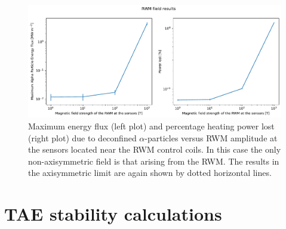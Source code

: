 \documentclass[10pt, a4paper, twoside]{article}
\begin{document}
\begin{figure}[!htb]
    \centering
    \includegraphics[width=0.99\linewidth]{Figures/max_and_total_flux_vs_bscale.pdf}
    \caption{Maximum energy flux (left plot) and percentage heating power lost (right plot) due to deconfined $\alpha$-particles versus RWM amplitude at the sensors located near the RWM control coils. In this case the only non-axisymmetric field is that arising from the RWM. The results in the axisymmetric limit are again shown by dotted horizontal lines.}
    \label{fig:max_and_total_flux_vs_bscale_rwm}
\end{figure}


\section{TAE stability calculations}
\label{sec:halo_work}
\end{document}
